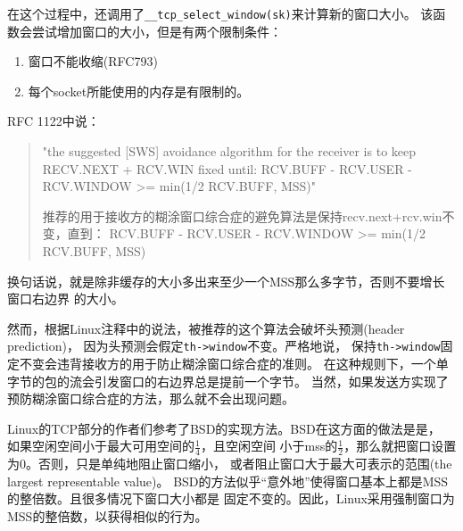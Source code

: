 \documentclass[11pt, a4paper,oneside]{book}
\theoremstyle{ocrenumbox}
\theoremstyle{purplenumbox}
\theoremstyle{blackbox}
\begin{document}
在这个过程中，还调用了\texttt{__tcp_select_window(sk)}来计算新的窗口大小。
该函数会尝试增加窗口的大小，但是有两个限制条件：

\begin{enumerate}
  \item 窗口不能收缩(RFC793)
  \item 每个socket所能使用的内存是有限制的。
\end{enumerate}

RFC 1122中说：
\begin{quote}
"the suggested [SWS] avoidance algorithm for the receiver is to keep
RECV.NEXT + RCV.WIN fixed until:
RCV.BUFF - RCV.USER - RCV.WINDOW >= min(1/2 RCV.BUFF, MSS)"

推荐的用于接收方的糊涂窗口综合症的避免算法是保持recv.next+rcv.win不变，直到：
RCV.BUFF - RCV.USER - RCV.WINDOW >= min(1/2 RCV.BUFF, MSS)
\end{quote}

换句话说，就是除非缓存的大小多出来至少一个MSS那么多字节，否则不要增长窗口右边界
的大小。

然而，根据Linux注释中的说法，被推荐的这个算法会破坏头预测(header prediction)，
因为头预测会假定\texttt{th->window}不变。严格地说，
保持\texttt{th->window}固定不变会违背接收方的用于防止糊涂窗口综合症的准则。
在这种规则下，一个单字节的包的流会引发窗口的右边界总是提前一个字节。
当然，如果发送方实现了预防糊涂窗口综合症的方法，那么就不会出现问题。

Linux的TCP部分的作者们参考了BSD的实现方法。BSD在这方面的做法是是，
如果空闲空间小于最大可用空间的$\frac{1}{4}$，且空闲空间
小于mss的$\frac{1}{2}$，那么就把窗口设置为0。否则，只是单纯地阻止窗口缩小，
或者阻止窗口大于最大可表示的范围(the largest representable value)。
BSD的方法似乎“意外地”使得窗口基本上都是MSS的整倍数。且很多情况下窗口大小都是
固定不变的。因此，Linux采用强制窗口为MSS的整倍数，以获得相似的行为。
\end{document}
